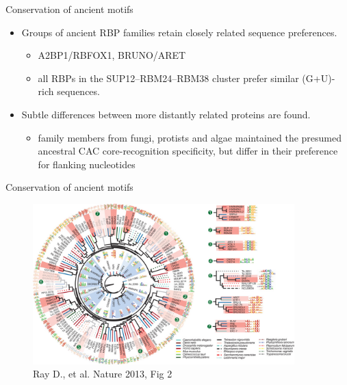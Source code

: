 \documentclass[professionalfont, 12pt, default]{beamer}
\providecommand{\tightlist}{%
    \setlength{\itemsep}{0pt}\setlength{\parskip}{0pt}}
\begin{document}
\begin{frame}{Conservation of ancient motifs}

\begin{itemize}
\tightlist
\item
  Groups of ancient RBP families retain closely related sequence
  preferences.

  \begin{itemize}
  \tightlist
  \item
    A2BP1/RBFOX1, BRUNO/ARET
  \item
    all RBPs in the SUP12--RBM24--RBM38 cluster prefer similar
    (G+U)-rich sequences.
  \end{itemize}
\item
  Subtle differences between more distantly related proteins are found.

  \begin{itemize}
  \tightlist
  \item
    family members from fungi, protists and algae maintained the
    presumed ancestral CAC core-recognition specificity, but differ in
    their preference for flanking nucleotides
  \end{itemize}
\end{itemize}

\end{frame}

\begin{frame}{Conservation of ancient motifs}

\begin{figure}
\centering
\includegraphics[width=0.90000\textwidth]{img/f2.jpg}
\caption{Ray D., et al. Nature 2013, Fig 2}
\end{figure}

\end{frame}
\end{document}
